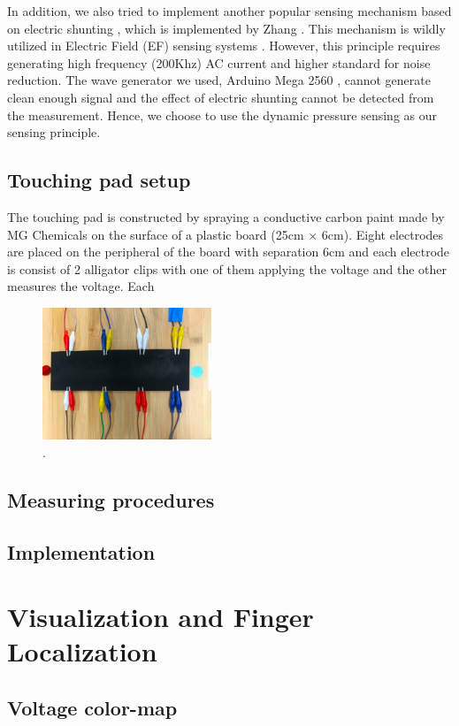 \documentclass[reprint,amsmath, amsfonts, amssymb, aps, letterpaper]{revtex4-1}
\begin{document}
In addition, we also tried to implement another popular sensing mechanism based on electric shunting \cite{shunt}, which is implemented by Zhang \cite{electrick}. This mechanism is wildly utilized in Electric Field (EF) sensing systems \cite{ef}. However, this principle requires generating high frequency (200Khz) AC current and higher standard for noise reduction. The wave generator we used, Arduino Mega 2560 \citep{arduino}, cannot generate clean enough signal and the effect of electric shunting cannot be detected from the measurement. Hence, we choose to use the dynamic pressure sensing as our sensing principle.
\subsection{Touching pad setup}
The touching pad is constructed by spraying a conductive carbon paint made by MG Chemicals \citep{carbon} on the surface of a plastic board (25cm $\times$ 6cm). Eight electrodes are placed on the peripheral of the board with separation 6cm and each electrode is consist of 2 alligator clips with one of them applying the voltage and the other measures the voltage. Each 
\begin{figure}[h]
\centering
    \includegraphics[width=0.45\textwidth]{./figure/pad}     
       \caption{. \citep{isoft} }
    \label{fig::pad}
\end{figure}
\subsection{Measuring procedures}
\subsection{Implementation}

\section{Visualization and Finger Localization}
\subsection{Voltage color-map}
\end{document}
